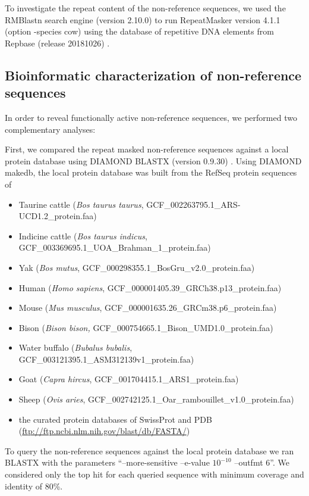 \documentclass[../main.tex]{subfiles}
\begin{document}
To investigate the repeat content of the non-reference sequences, we used the RMBlastn search engine (version 2.10.0) to run RepeatMasker version 4.1.1 (option -species cow) \citep{Smit2015} using the database of repetitive DNA elements from Repbase (release 20181026) \citep{bao2015repbase}.  

\subsection*{Bioinformatic characterization of non-reference sequences}

In order to reveal functionally active non-reference sequences, we performed two complementary analyses: 

First, we compared the repeat masked non-reference sequences against a local protein database using DIAMOND BLASTX (version 0.9.30) \citep{buchfink2015fast}. Using DIAMOND makedb, the local protein database was built from the RefSeq protein sequences of

\begin{itemize}
\item Taurine cattle (\emph{Bos taurus taurus}, GCF\_002263795.1\_ARS-UCD1.2\_protein.faa)
\item Indicine cattle (\emph{Bos taurus indicus}, GCF\_003369695.1\_UOA\_Brahman\_1\_protein.faa)
\item Yak (\emph{Bos mutus}, GCF\_000298355.1\_BosGru\_v2.0\_protein.faa)
\item Human (\emph{Homo sapiens}, GCF\_000001405.39\_GRCh38.p13\_protein.faa)
\item Mouse (\emph{Mus musculus}, GCF\_000001635.26\_GRCm38.p6\_protein.faa)
\item Bison (\emph{Bison bison,} GCF\_000754665.1\_Bison\_UMD1.0\_protein.faa)
\item Water buffalo (\emph{Bubalus bubalis}, GCF\_003121395.1\_ASM312139v1\_protein.faa)
\item Goat (\emph{Capra hircus}, GCF\_001704415.1\_ARS1\_protein.faa)
\item Sheep (\emph{Ovis aries}, GCF\_002742125.1\_Oar\_rambouillet\_v1.0\_protein.faa)
\item the curated protein databases of SwissProt and PDB (\url{ftp://ftp.ncbi.nlm.nih.gov/blast/db/FASTA/}) 
\end{itemize}


To query the non-reference sequences against the local protein database we ran BLASTX with the parameters “--more-sensitive --e-value $10^{-10}$ --outfmt 6”. We considered only the top hit for each queried sequence with minimum coverage and identity of 80\%.
\end{document}
